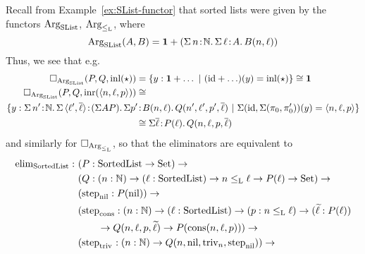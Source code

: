 \documentclass[orivec,envcountsame, ,envcountsect]{llncs}
\begin{document}
 \begin{example}
   Recall from Example~\ref{ex:SList-functor} that sorted lists were given by the functors $\text{Arg}_{\text{SList}}$, $\text{Arg}_{\leq_{\text{L}}}$, where
\[ %
  \ArgSList(A, B) = \one + (\Sigma\, n\!:\!\Nat .\,\Sigma\,\ell\!:\!A.\, B(n,\ell))
\] %
   Thus, we see that e.g.\ 
   \begin{align*}
\BOX_{\ArgSList}(P, Q, \inl(\oneelt)) &=  
\{ y : \one + \ldots \ |\ (\id + \ldots)(y) = \inl(\oneelt) \} \cong \one \\
\BOX_{\ArgSList}(P, Q, \inr(\langle n, \ell, p\rangle)) &\cong \\
\{ y : \Sigma\, n'\!:\!\Nat .\,\Sigma\,\langle \ell', \overline{\ell}\rangle\!:\!(\Sigma A P).\, \Sigma p'\!&:\!B(n,\ell).\,Q(n', \ell', p', \overline{\ell})\ |\ \Sigma(\id, \Sigma(\pi_0, \pi'_0))(y) = \langle n, \ell, p\rangle\} \\
 & \cong \Sigma \overline{\ell}\!:\!P(\ell).\,Q(n, \ell, p, \overline{\ell})
   \end{align*}
   and similarly for $\Box_{\text{Arg}_{\leq_{\text{L}}}}$, so that the eliminators are equivalent to
   \begin{align*}
  \elim_{\SortedList} :\ & (P : \SortedList \to \Set) \to \\
                     & (Q : (n : \Nat) \to (\ell : \SortedList) \to n \lessList \ell \to P(\ell) \to \Set) \to \\
                     & (\stepind{\nilList} : P(\nilList)) \to \\
                     & (\stepind{\consListbare} : (n : \Nat) \to (\ell : \SortedList) \to (p : n \lessList \ell) \to (\stepindarg{\ell} : P(\ell)) \\
                     & \qquad \to Q(n, \ell, p, \stepindarg{\ell}) \to P(\consList{n}{\ell}{p})) \to \\
                     & (\stepind{\nilLess{}} : (n : \Nat) \to Q(n, \nilList, \nilLess{n}, \stepind{\nilList})) \to \\

\end{align*}
\end{example}
\end{document}

